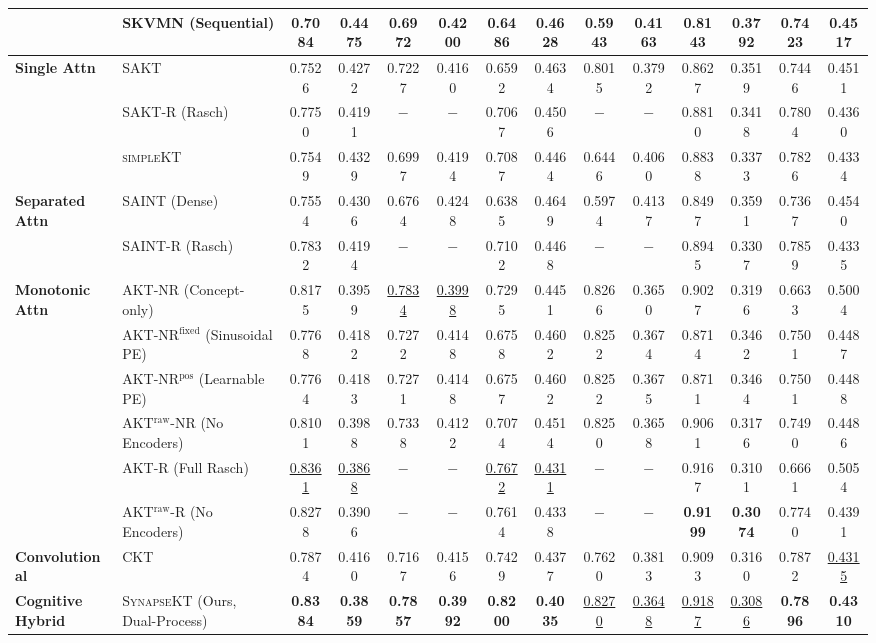 \documentclass[11pt]{article}
\begin{document}
\begin{table}[t]
{\begin{tabular}{llcccccccccccc}
& \textsc{SKVMN} (Sequential) & 0.7084 & 0.4475 & 0.6972 & 0.4200 & 0.6486 & 0.4628 & 0.5943 & 0.4163 & 0.8143 & 0.3792 & 0.7423 & 0.4517 \\
\midrule
\textbf{Single Attn} & \textsc{SAKT} & 0.7526 & 0.4272 & 0.7227 & 0.4160 & 0.6592 & 0.4634 & 0.8015 & 0.3792 & 0.8627 & 0.3519 & 0.7446 & 0.4511 \\
& \textsc{SAKT-R} (Rasch) & 0.7750 & 0.4191 & $-$ & $-$ & 0.7067 & 0.4506 & $-$ & $-$ & 0.8810 & 0.3418 & 0.7804 & 0.4360 \\
& \textsc{simpleKT} & 0.7549 & 0.4329 & 0.6997 & 0.4194 & 0.7087 & 0.4464 & 0.6446 & 0.4060 & 0.8838 & 0.3373 & 0.7826 & 0.4334 \\
\midrule
\textbf{Separated Attn} & \textsc{SAINT} (Dense) & 0.7554 & 0.4306 & 0.6764 & 0.4248 & 0.6385 & 0.4649 & 0.5974 & 0.4137 & 0.8497 & 0.3591 & 0.7367 & 0.4540 \\
& \textsc{SAINT-R} (Rasch) & 0.7832 & 0.4194 & $-$ & $-$ & 0.7102 & 0.4468 & $-$ & $-$ & 0.8945 & 0.3307 & 0.7859 & 0.4335 \\
\midrule
\textbf{Monotonic Attn} & \textsc{AKT-NR} (Concept-only) & 0.8175 & 0.3959 & \underline{0.7834} & \underline{0.3998} & 0.7295 & 0.4451 & 0.8266 & 0.3650 & 0.9027 & 0.3196 & 0.6633 & 0.5004 \\
& \textsc{AKT-NR}$^{\text{fixed}}$ (Sinusoidal PE) & 0.7768 & 0.4182 & 0.7272 & 0.4148 & 0.6758 & 0.4602 & 0.8252 & 0.3674 & 0.8714 & 0.3462 & 0.7501 & 0.4487 \\
& \textsc{AKT-NR}$^{\text{pos}}$ (Learnable PE) & 0.7764 & 0.4183 & 0.7271 & 0.4148 & 0.6757 & 0.4602 & 0.8252 & 0.3675 & 0.8711 & 0.3464 & 0.7501 & 0.4488 \\
& \textsc{AKT}$^{\text{raw}}$-\textsc{NR} (No Encoders) & 0.8101 & 0.3988 & 0.7338 & 0.4122 & 0.7074 & 0.4514 & 0.8250 & 0.3658 & 0.9061 & 0.3176 & 0.7490 & 0.4486 \\
& \textsc{AKT-R} (Full Rasch) & \underline{0.8361} & \underline{0.3868} & $-$ & $-$ & \underline{0.7672} & \underline{0.4311} & $-$ & $-$ & 0.9167 & 0.3101 & 0.6661 & 0.5054 \\
& \textsc{AKT}$^{\text{raw}}$-\textsc{R} (No Encoders) & 0.8278 & 0.3906 & $-$ & $-$ & 0.7614 & 0.4338 & $-$ & $-$ & \textbf{0.9199} & \textbf{0.3074} & 0.7740 & 0.4391 \\
\midrule
\textbf{Convolutional} & \textsc{CKT} & 0.7874 & 0.4160 & 0.7167 & 0.4156 & 0.7429 & 0.4377 & 0.7620 & 0.3813 & 0.9093 & 0.3160 & 0.7872 & \underline{0.4315} \\
\midrule
\textbf{Cognitive Hybrid} & \textsc{SynapseKT} (Ours, Dual-Process) & \textbf{0.8384} & \textbf{0.3859} & \textbf{0.7857} & \textbf{0.3992} & \textbf{0.8200} & \textbf{0.4035} & \underline{0.8270} & \underline{0.3648} & \underline{0.9187} & \underline{0.3086} & \textbf{0.7896} & \textbf{0.4310} \\
\bottomrule
\end{tabular}
}
\end{table}
\end{document}
